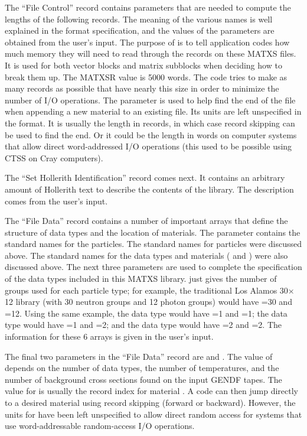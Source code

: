 The ``File Control'' record contains parameters that are needed to
compute the lengths of the following records.  The meaning of the
various names is well explained in the format specification, and the
values of the parameters are obtained from the user's input.
The purpose of  is to tell application codes how much
memory they will need to read through the records on these MATXS files.
It is used for both vector blocks and matrix subblocks when deciding
how to break them up.  The MATXSR value is 5000 words.  The code tries
to make as many records as possible that have nearly this size in order
to minimize the number of I/O operations.  The parameter  is
used to help find the end of the file when appending a new material
to an existing file.  Its units are left unspecified in the format.
It is usually the length in records, in which case record skipping
can be used to find the end.  Or it could be the length in words on
computer systems that allow direct word-addressed I/O operations
(this used to be possible using CTSS on Cray computers).

The ``Set Hollerith Identification'' record comes next.  It contains
an arbitrary amount of Hollerith text to describe the contents of the
library.  The description comes from the user's input.

The ``File Data'' record contains a number of important arrays that
define the structure of data types and the location of materials.  The
parameter  contains the standard names for the 
particles.  The standard names for particles were discussed above.  The
standard names for the data types and materials ( and
) were also discussed above.  The next three parameters
are used to complete the specification of the data types included in
this MATXS library.   just gives the number of groups used
for each particle type; for example, the traditional Los Alamos
30$\times$12 library (with 30 neutron groups and 12 photon groups)
would have =30 and =12.  Using the same
example, the  data type would have =1
and =1; the  data type would have
=1 and =2; and the  data
type would have =2 and =2.  The
information for these 6 arrays is given in the user's input.

The final two parameters in the ``File Data'' record are
 and .  The value of  depends
on the number of data types, the number of temperatures, and
the number of background cross sections found on the input
GENDF tapes.  The value for  is usually the record
index for material .  A code can then jump directly to a desired
material using record skipping (forward or backward).  However, the
units for  have been left unspecified to allow direct
random access for systems that use word-addressable random-access
I/O operations.

